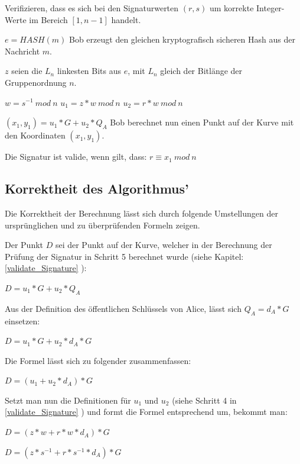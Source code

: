 \begin{compactenum}[(1)]
	\item Verifizieren, dass es sich bei den Signaturwerten $(r,s)$ um korrekte Integer-Werte im Bereich $[1, n-1]$ handelt.
	\item $e = HASH(m)$ \newline Bob erzeugt den gleichen kryptografisch sicheren Hash aus der Nachricht $m$.
	\item $z$ seien die $L_n$ linkesten Bits aus $e$, mit $L_n$ gleich der Bitlänge der Gruppenordnung $n$.
	\item $w = s^{-1}\ mod\ n$ \newline $u_1 = z*w\ mod\ n$ \newline $u_2 = r*w\ mod\ n$
	\item $(x_1, y_1) = u_1 * G + u_2 * Q_A$ \newline Bob berechnet nun einen Punkt auf der Kurve mit den Koordinaten $(x_1, y_1)$.
\end{compactenum}

Die Signatur ist valide, wenn gilt, dass: $r \equiv x_1\ mod\ n$

\subsection{Korrektheit des Algorithmus'}

Die Korrektheit der Berechnung lässt sich durch folgende Umstellungen der ursprünglichen und zu überprüfenden Formeln zeigen.

Der Punkt $D$ sei der Punkt auf der Kurve, welcher in der Berechnung der Prüfung der Signatur in Schritt 5 
berechnet wurde (siehe Kapitel: \ref{validate_Signature} ):

$D = u_1 * G + u_2 * Q_A$

Aus der Definition des öffentlichen Schlüssels von Alice, lässt sich $Q_A = d_A*G$ einsetzen:

$D = u_1 * G + u_2 * d_A * G$

Die Formel lässt sich zu folgender zusammenfassen:

$D = (u_1 + u_2 * d_A) * G$

Setzt man nun die Definitionen für $u_1$ und $u_2$ (siehe Schritt 4 in \ref{validate_Signature} )
und formt die Formel entsprechend um, bekommt man:

$D = (z*w + r*w*d_A) * G$

$D = (z*s^{-1} + r*s^{-1}*d_A) * G$

